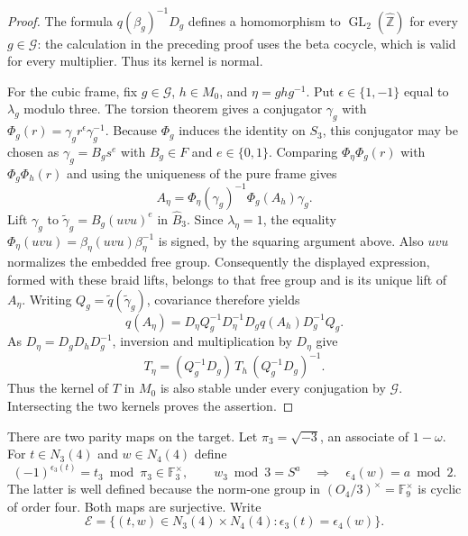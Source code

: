 \begin{proof}
The formula $q(\beta_g)^{-1}D_g$ defines a homomorphism to
$\operatorname{GL}_2(\widehat{\mathbb Z})$ for every $g\in\mathcal G$:
the calculation in the preceding proof uses the beta cocycle,
which is valid for every multiplier.  Thus its kernel is normal.

For the cubic frame, fix $g\in\mathcal G$, $h\in M_0$, and
$\eta=ghg^{-1}$.  Put $\epsilon\in\{1,-1\}$ equal to
$\lambda_g$ modulo three.  The torsion theorem gives a conjugator
$\gamma_g$ with
$\Phi_g(r)=\gamma_g r^\epsilon\gamma_g^{-1}$.
Because $\Phi_g$ induces the identity on $S_3$, this conjugator
may be chosen as $\gamma_g=B_gs^e$ with $B_g\in F$ and
$e\in\{0,1\}$.  Comparing
$\Phi_\eta\Phi_g(r)$ with $\Phi_g\Phi_h(r)$ and using the
uniqueness of the pure frame gives
\[
 A_\eta=\Phi_\eta(\gamma_g)^{-1}\Phi_g(A_h)\gamma_g.
\]
Lift $\gamma_g$ to $\widetilde\gamma_g=B_g(uvu)^e$ in
$\widehat B_3$.  Since $\lambda_\eta=1$, the equality
$\Phi_\eta(uvu)=\beta_\eta(uvu)\beta_\eta^{-1}$ is signed,
by the squaring argument above.  Also $uvu$ normalizes the embedded
free group.  Consequently the displayed expression, formed with
these braid lifts, belongs to that free group and is its unique
lift of $A_\eta$.  Writing
$Q_g=\widetilde q(\widetilde\gamma_g)$, covariance therefore yields
\[
 q(A_\eta)=D_\eta Q_g^{-1}D_\eta^{-1}
                 D_gq(A_h)D_g^{-1}Q_g.
\]
As $D_\eta=D_gD_hD_g^{-1}$, inversion and multiplication by
$D_\eta$ give
\begin{equation}
 T_\eta=(Q_g^{-1}D_g)\,T_h\,(Q_g^{-1}D_g)^{-1}.
 \label{eq:adelic-cubic-kernel-conjugation}
\end{equation}
Thus the kernel of $T$ in $M_0$ is also stable under every
conjugation by $\mathcal G$.  Intersecting the two kernels proves
the assertion.
\end{proof}

There are two parity maps on the target.  Let
$\pi_3=\sqrt{-3}$, an associate of $1-\omega$.  For $t\in N_3(4)$
and $w\in N_4(4)$ define
\begin{equation}
 (-1)^{\epsilon_3(t)}=t_3\bmod\pi_3\in\mathbb F_3^{\times},\qquad
 w_3\bmod3=S^a\quad\Longrightarrow\quad
 \epsilon_4(w)=a\bmod2.
 \label{eq:adelic-parities}
\end{equation}
The latter is well defined because the norm-one group in
$(O_4/3)^{\times}=\mathbb F_9^{\times}$ is cyclic of order four.
Both maps are surjective.  Write
\begin{equation}
 \mathcal E=\{(t,w)\in N_3(4)\times N_4(4):
                       \epsilon_3(t)=\epsilon_4(w)\}.
 \label{eq:adelic-equal-parity}
\end{equation}

